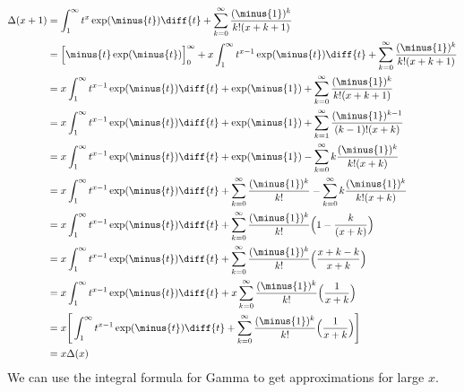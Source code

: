 \documentclass[crop=false,class=book,oneside]{standalone}
\begin{document}
        \begin{subequations}
            \begin{align}
                \Delta(x+1)&=
                \int_{1}^{\infty}t^{x}\exp(\minus{t})\diff{t}+
                \sum_{k=0}^{\infty}\frac{(\minus{1})^{k}}{k!(x+k+1)}\\
                &=\Big[\minus{t}\exp(\minus{t})\Big]_{0}^{\infty}+
                x\int_{1}^{\infty}t^{x-1}\exp(\minus{t})\diff{t}+
                \sum_{k=0}^{\infty}\frac{(\minus{1})^{k}}{k!(x+k+1)}\\
                &=x\int_{1}^{\infty}t^{x-1}\exp(\minus{t})\diff{t}+
                \exp(\minus{1})+\sum_{k=0}^{\infty}
                \frac{(\minus{1})^{k}}{k!(x+k+1)}\\
                &=x\int_{1}^{\infty}t^{x-1}\exp(\minus{t})\diff{t}+
                \exp(\minus{1})+\sum_{k=1}^{\infty}
                \frac{(\minus{1})^{k-1}}{(k-1)!(x+k)}\\
                &=x\int_{1}^{\infty}t^{x-1}\exp(\minus{t})\diff{t}+
                \exp(\minus{1})-\sum_{k=0}^{\infty}
                k\frac{(\minus{1})^{k}}{k!(x+k)}\\
                &=x\int_{1}^{\infty}t^{x-1}\exp(\minus{t})\diff{t}+
                \sum_{k=0}^{\infty}\frac{(\minus{1})^{k}}{k!}-
                \sum_{k=0}^{\infty}k\frac{(\minus{1})^{k}}{k!(x+k)}\\
                &=x\int_{1}^{\infty}t^{x-1}\exp(\minus{t})\diff{t}+
                \sum_{k=0}^{\infty}\frac{(\minus{1})^{k}}{k!}
                \Big(1-\frac{k}{(x+k)}\Big)\\
                &=x\int_{1}^{\infty}t^{x-1}\exp(\minus{t})\diff{t}+
                \sum_{k=0}^{\infty}\frac{(\minus{1})^{k}}{k!}
                \Big(\frac{x+k-k}{x+k}\Big)\\
                &=x\int_{1}^{\infty}t^{x-1}\exp(\minus{t})\diff{t}+
                x\sum_{k=0}^{\infty}\frac{(\minus{1})^{k}}{k!}
                \Big(\frac{1}{x+k}\Big)\\
                &=x\Bigg[\int_{1}^{\infty}t^{x-1}
                \exp(\minus{t})\diff{t}+
                \sum_{k=0}^{\infty}\frac{(\minus{1})^{k}}{k!}
                \Big(\frac{1}{x+k}\Big)\Bigg]\\
                &=x\Delta(x)
            \end{align}
        \end{subequations}
        We can use the integral formula for Gamma to get
        approximations for large $x$.
\end{document}
